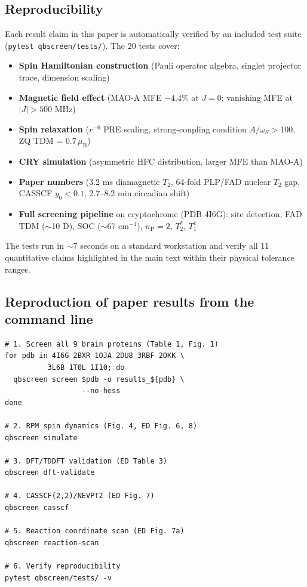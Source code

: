 \subsection*{Reproducibility}

Each result claim in this paper is automatically verified by an included test suite (\texttt{pytest qbscreen/tests/}). The 20 tests cover:

\begin{itemize}
\setlength{\itemsep}{0pt}
\item \textbf{Spin Hamiltonian construction} (Pauli operator algebra, singlet projector trace, dimension scaling)
\item \textbf{Magnetic field effect} (MAO-A MFE $-4.4$\% at $J = 0$; vanishing MFE at $|J| > 500$ MHz)
\item \textbf{Spin relaxation} ($r^{-6}$ PRE scaling, strong-coupling condition $A/\omega_S > 100$, ZQ TDM = $0.7\,\mu_\mathrm{B}$)
\item \textbf{CRY simulation} (asymmetric HFC distribution, larger MFE than MAO-A)
\item \textbf{Paper numbers} (3.2 ms diamagnetic $T_2$, 64-fold PLP/FAD nuclear $T_2$ gap, CASSCF $y_0 < 0.1$, 2.7--8.2 min circadian shift)
\item \textbf{Full screening pipeline} on cryptochrome (PDB 4I6G): site detection, FAD TDM ($\sim$10 D), SOC ($\sim$67 cm$^{-1}$), $n_\mathrm{P} = 2$, $T_2^*$, $T_1^e$
\end{itemize}

The tests run in $\sim$7 seconds on a standard workstation and verify all 11 quantitative claims highlighted in the main text within their physical tolerance ranges.

\subsection*{Reproduction of paper results from the command line}

\begin{verbatim}
# 1. Screen all 9 brain proteins (Table 1, Fig. 1)
for pdb in 4I6G 2BXR 1OJA 2DU8 3RBF 2OKK \
          3L6B 1T0L 1I10; do
  qbscreen screen $pdb -o results_${pdb} \
                  --no-hess
done

# 2. RPM spin dynamics (Fig. 4, ED Fig. 6, 8)
qbscreen simulate

# 3. DFT/TDDFT validation (ED Table 3)
qbscreen dft-validate

# 4. CASSCF(2,2)/NEVPT2 (ED Fig. 7)
qbscreen casscf

# 5. Reaction coordinate scan (ED Fig. 7a)
qbscreen reaction-scan

# 6. Verify reproducibility
pytest qbscreen/tests/ -v
\end{verbatim}

